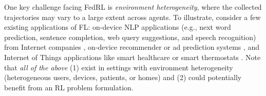 \documentclass{article} %
\theoremstyle{plain}
\theoremstyle{definition}
\theoremstyle{remark}
\begin{document}
One key challenge facing FedRL is \emph{environment heterogeneity}, where the collected trajectories may vary to a large extent across agents.  To illustrate, consider a few existing applications of FL: on-device NLP applications (e.g., next word prediction, sentence completion, web query suggestions, and speech recognition) from Internet companies \citep{hard2018federated,yang2018applied,wang2023now}, on-device recommender or ad prediction systems \citep{maeng2022towards,krichene2023private}, and Internet of Things applications like smart healthcare or smart thermostats \citep{nguyen2021federated,imteaj2022federated,zhang2022federated,boubouh2023efficacy}. Note that \emph{all of the above} (1) exist in settings with environment heterogeneity (heterogeneous users, devices, patients, or homes) and (2) could potentially benefit from an RL problem formulation.
\end{document}
